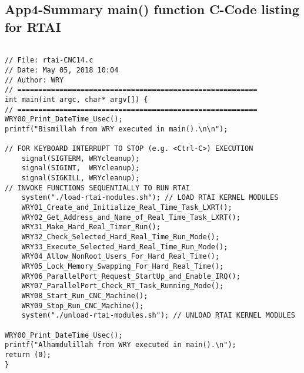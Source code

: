 	
\subsection{App4-Summary main() function C-Code listing for RTAI}


\begin{lstlisting}[caption={App4-Summary main() function C-Code listing for RTAI}, label=App4-Summary main() function C-Code listing for RTAI]

// File: rtai-CNC14.c
// Date: May 05, 2018 10:04
// Author: WRY
// =========================================================
int main(int argc, char* argv[]) {
// =========================================================
WRY00_Print_DateTime_Usec(); 
printf("Bismillah from WRY executed in main().\n\n");
	
// FOR KEYBOARD INTERRUPT TO STOP (e.g. <Ctrl-C>) EXECUTION
	signal(SIGTERM, WRYcleanup);
	signal(SIGINT,  WRYcleanup);
	signal(SIGKILL, WRYcleanup);
// INVOKE FUNCTIONS SEQUENTIALLY TO RUN RTAI
	system("./load-rtai-modules.sh"); // LOAD RTAI KERNEL MODULES
	WRY01_Create_and_Initialize_Real_Time_Task_LXRT();
	WRY02_Get_Address_and_Name_of_Real_Time_Task_LXRT();
	WRY31_Make_Hard_Real_Timer_Run(); 
	WRY32_Check_Selected_Hard_Real_Time_Run_Mode(); 
	WRY33_Execute_Selected_Hard_Real_Time_Run_Mode();
	WRY04_Allow_NonRoot_Users_For_Hard_Real_Time();
	WRY05_Lock_Memory_Swapping_For_Hard_Real_Time();
	WRY06_ParallelPort_Request_StartUp_and_Enable_IRQ(); 
	WRY07_ParallelPort_Check_RT_Task_Running_Mode();
	WRY08_Start_Run_CNC_Machine();
	WRY09_Stop_Run_CNC_Machine();
	system("./unload-rtai-modules.sh"); // UNLOAD RTAI KERNEL MODULES

WRY00_Print_DateTime_Usec(); 
printf("Alhamdulillah from WRY executed in main().\n"); 
return (0);
}
\end{lstlisting}

